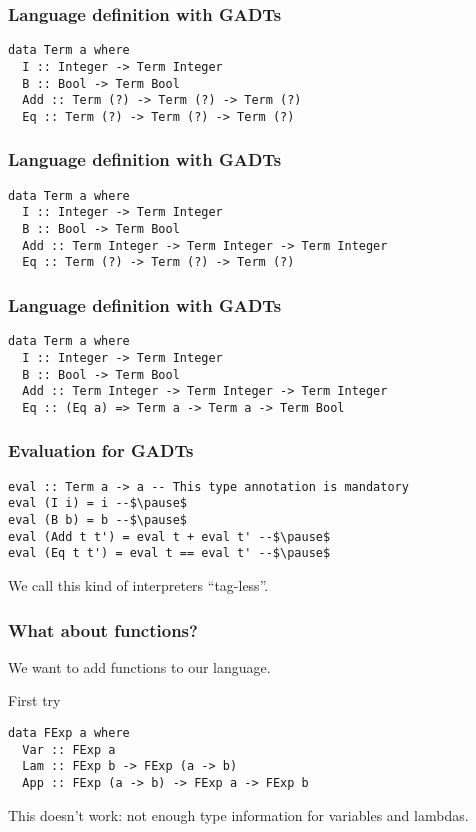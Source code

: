 \documentclass[pdftex,aspectratio=169]{beamer}
\begin{document}
\begin{frame}[fragile]
  \frametitle{Language definition with GADTs}
  \begin{block}{}
    \begin{lstlisting}
data Term a where
  I :: Integer -> Term Integer
  B :: Bool -> Term Bool
  Add :: Term (?) -> Term (?) -> Term (?)
  Eq :: Term (?) -> Term (?) -> Term (?)
    \end{lstlisting}
  \end{block}
\end{frame}

\begin{frame}[fragile]
  \frametitle{Language definition with GADTs}
  \begin{block}{}
    \begin{lstlisting}
data Term a where
  I :: Integer -> Term Integer
  B :: Bool -> Term Bool
  Add :: Term Integer -> Term Integer -> Term Integer
  Eq :: Term (?) -> Term (?) -> Term (?)
    \end{lstlisting}
  \end{block}
\end{frame}

\begin{frame}[fragile]
  \frametitle{Language definition with GADTs}
  \begin{block}{}
    \begin{lstlisting}
data Term a where
  I :: Integer -> Term Integer
  B :: Bool -> Term Bool
  Add :: Term Integer -> Term Integer -> Term Integer
  Eq :: (Eq a) => Term a -> Term a -> Term Bool
    \end{lstlisting}
  \end{block}
\end{frame}

\begin{frame}[fragile]
  \frametitle{Evaluation for GADTs}
  \begin{block}{}
    \begin{lstlisting}
eval :: Term a -> a -- This type annotation is mandatory
eval (I i) = i --$\pause$
eval (B b) = b --$\pause$
eval (Add t t') = eval t + eval t' --$\pause$
eval (Eq t t') = eval t == eval t' --$\pause$
    \end{lstlisting}
  \end{block}\pause

  We call this kind of interpreters ``tag-less''.
\end{frame}

\begin{frame}[fragile]
  \frametitle{What about functions?}

  We want to add functions to our language.\pause

  \begin{block}{First try}
    \begin{lstlisting}
data FExp a where
  Var :: FExp a
  Lam :: FExp b -> FExp (a -> b)
  App :: FExp (a -> b) -> FExp a -> FExp b      
    \end{lstlisting}
  \end{block}\pause

  This doesn't work: not enough type information for variables and lambdas.
\end{frame}
\end{document}
